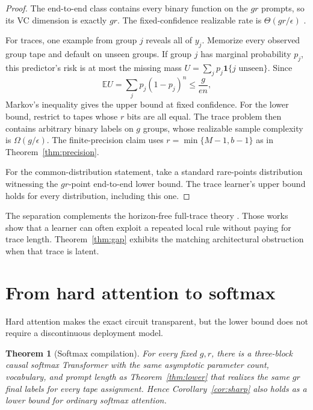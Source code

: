 \documentclass{article}
\newtheorem{theorem}{Theorem}
\newcommand{\E}{\mathbb E}
\newcommand{\1}{\mathbf 1}
\begin{document}
\begin{proof}
The end-to-end class contains every binary function on the $gr$ prompts, so its VC dimension is exactly $gr$. The fixed-confidence realizable rate is $\Theta(gr/\epsilon)$ \citep{hanneke2016optimal}.

For traces, one example from group $j$ reveals all of $y_j$. Memorize every observed group tape and default on unseen groups. If group $j$ has marginal probability $p_j$, this predictor's risk is at most the missing mass $U=\sum_jp_j\1\{j\text{ unseen}\}$. Since \[ \E U=\sum_jp_j(1-p_j)^n\leq \frac{g}{e n}, \] Markov's inequality gives the upper bound at fixed confidence. For the lower bound, restrict to tapes whose $r$ bits are all equal. The trace problem then contains arbitrary binary labels on $g$ groups, whose realizable sample complexity is $\Omega(g/\epsilon)$. The finite-precision claim uses $r=\min\{M-1,b-1\}$ as in Theorem~\ref{thm:precision}.

For the common-distribution statement, take a standard rare-points distribution witnessing the $gr$-point end-to-end lower bound. The trace learner's upper bound holds for every distribution, including this one.
\end{proof}

The separation complements the horizon-free full-trace theory \citep{joshi2025theory,hanneke2026sample,li2026optimal,yang2026tight}. Those works show that a learner can often exploit a repeated local rule without paying for trace length. Theorem~\ref{thm:gap} exhibits the matching architectural obstruction when that trace is latent.

\section{From hard attention to softmax}

Hard attention makes the exact circuit transparent, but the lower bound does not require a discontinuous deployment model.

\begin{theorem}[Softmax compilation]\label{thm:softmax}
For every fixed $g,r$, there is a three-block causal softmax Transformer with the same asymptotic parameter count, vocabulary, and prompt length as Theorem~\ref{thm:lower} that realizes the same $gr$ final labels for every tape assignment. Hence Corollary~\ref{cor:sharp} also holds as a lower bound for ordinary softmax attention.
\end{theorem}
\end{document}
